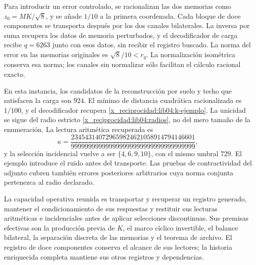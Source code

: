 Para introducir un error controlado, se racionalizan las dos memorias
como \(z_0=MK/\sqrt8\), y se añade \(1/10\) a la primera
coordenada. Cada bloque de doce componentes se transporta después
por los dos canales bilaterales. La inversa por suma recupera los
datos de memoria perturbados, y el decodificador de carga recibe
\(q=6263\) junto con esos datos, sin recibir el registro buscado.
La norma del error en las memorias originales es
\(\sqrt8/10<r_q\). La normalización isométrica conserva esa norma;
los canales sin normalizar sólo facilitan el cálculo racional exacto.

En esta instancia, los candidatos de la reconstrucción por suelo y
techo que satisfacen la carga son \(924\). El mínimo de distancia
cuadrática racionalizada es \(1/100\), y el decodificador recupera
\eqref{x_reciprocidad:lib04:k-ejemplo}. La unicidad se sigue del radio estricto
\eqref{x_reciprocidad:lib04:radios}, no del mero tamaño de la enumeración.
La lectura aritmética recuperada es
\begin{equation}
 \kappa=
 \frac{234543140729659824621058914794146601}
      {999999999999999999999999999999999999},
 \label{x_reciprocidad:lib04:kappa-ejemplo}
\end{equation}
y la selección incidencial vuelve a ser \(\{4,6,9,10\}\), con
el mismo umbral \(729\). El ejemplo introduce el ruido antes del
transporte. Las pruebas de contractividad del adjunto cubren también
errores posteriores arbitrarios cuya norma conjunta pertenezca al
radio declarado.

La capacidad operativa reunida es transportar y recuperar un registro
generado, mantener el condicionamiento de sus respuestas y restituir
sus lecturas aritméticas e incidenciales antes de aplicar selecciones
discontinuas. Sus premisas efectivas son la producción previa de
\(K\), el marco cíclico invertible, el balance bilateral, la
separación discreta de las memorias y el teorema de archivo. El
registro de doce componentes conserva el alcance de sus lectores;
la historia enriquecida completa mantiene sus otros registros y
dependencias.
